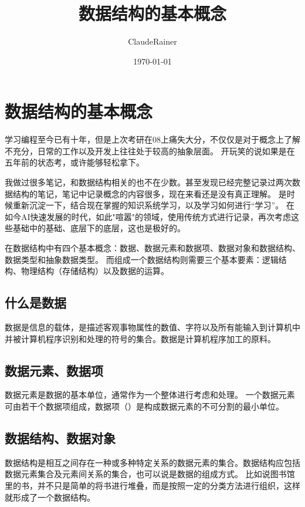 \documentclass[b5paper,11pt]{article}
\title{数据结构的基本概念}
\author{ClaudeRainer}
\date{\today}
\begin{document}
\maketitle

\section{数据结构的基本概念}
\begin{cquote}
  学习编程至今已有十年，但是上次考研在08上痛失大分，不仅仅是对于概念上了解不充分，日常的工作以及开发上往往处于较高的抽象层面。
  开玩笑的说如果是在五年前的状态考，或许能够轻松拿下。

  我做过很多笔记，和数据结构相关的也不在少数。甚至发现已经完整记录过两次数据结构的笔记，笔记中记录概念的内容很多，现在来看还是没有真正理解。
  是时候重新沉淀一下，结合现在掌握的知识系统学习，以及学习如何进行“学习”。
  在如今AI快速发展的时代，如此"喧嚣"的领域，使用传统方式进行记录，再次考虑这些基础中的基础、底层下的底层，这也是极好的。

\end{cquote}

在数据结构中有四个基本概念：数据、数据元素和数据项、数据对象和数据结构、数据类型和抽象数据类型。
而组成一个数据结构则需要三个基本要素：逻辑结构、物理结构（存储结构）以及数据的运算。

\subsection{什么是数据}
数据是信息的载体，是描述客观事物属性的数值、字符以及所有能输入到计算机中并被计算机程序识别和处理的符号的集合。数据是计算机程序加工的原料。

{\color{ctp-lavender}{可以说，只要能被表示为1和0这样的基本符号的信息，均是一种数据。}}

\subsection{数据元素、数据项}
数据元素是数据的基本单位，通常作为一个整体进行考虑和处理。
一个数据元素可由若干个数据项组成，数据项（）是构成数据元素的不可分割的最小单位。

\subsection{数据结构、数据对象}
数据结构是相互之间存在一种或多种特定关系的数据元素的集合。数据结构应包括数据元素集合及元素间关系的集合，也可以说是数据的组成方式。
比如说图书馆里的书，并不只是简单的将书进行堆叠，而是按照一定的分类方法进行组织，这样就形成了一个数据结构。
\end{document}
